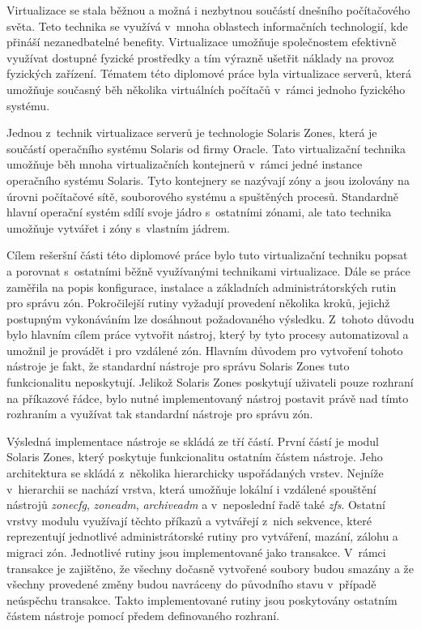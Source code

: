 \label{chapte:conclusion}
Virtualizace se stala běžnou a možná i nezbytnou součástí dnešního počítačového světa. Teto technika se využívá v~mnoha oblastech
informačních technologií, kde přináší nezanedbatelné benefity. Virtualizace umožňuje společnostem efektivně využívat dostupné 
fyzické prostředky a tím výrazně ušetřit náklady na provoz fyzických zařízení. Tématem této diplomové práce byla virtualizace serverů,
která umožňuje současný běh několika virtuálních počítačů v~rámci jednoho fyzického systému.

Jednou z~technik virtualizace serverů je technologie Solaris Zones, která je součástí operačního systému Solaris od firmy Oracle.
Tato virtualizační technika umožňuje běh mnoha virtualizačních kontejnerů v~rámci jedné instance operačního systému Solaris. Tyto
kontejnery se nazývají zóny a jsou izolovány na úrovni počítačové sítě, souborového systému a spuštěných procesů. Standardně hlavní
operační systém sdílí svoje jádro s~ostatními zónami, ale tato technika umožňuje vytvářet i zóny s~vlastním jádrem.

Cílem rešeršní části této diplomové práce bylo tuto virtualizační techniku popsat a porovnat s~ostatními běžně využívanými technikami
virtualizace. Dále se práce zaměřila na popis konfigurace, instalace a základních administrátorských rutin pro správu zón.
Pokročilejší rutiny vyžadují provedení několika kroků, jejichž postupným vykonáváním lze dosáhnout požadovaného výsledku. Z~tohoto
důvodu bylo hlavním cílem práce vytvořit nástroj, který by tyto procesy automatizoval a umožnil je provádět i pro vzdálené zón.
Hlavním důvodem pro vytvoření tohoto nástroje je fakt, že standardní nástroje pro správu Solaris Zones tuto funkcionalitu neposkytují.
Jelikož Solaris Zones poskytují uživateli pouze rozhraní na příkazové řádce, bylo nutné implementovaný nástroj postavit právě nad tímto
rozhraním a využívat tak standardní nástroje pro správu zón.

Výsledná implementace nástroje se skládá ze tří částí. První částí je modul Solaris Zones, který poskytuje funkcionalitu ostatním
částem nástroje. Jeho architektura se skládá z~několika hierarchicky uspořádaných vrstev. Nejníže v~hierarchii se nachází vrstva,
která umožňuje lokální i vzdálené spouštění nástrojů \textit{zonecfg}, \textit{zoneadm}, \textit{archiveadm} a v~neposlední řadě 
také \textit{zfs}. Ostatní vrstvy modulu využívají těchto příkazů a vytvářejí z~nich sekvence, které reprezentují jednotlivé 
administrátorské rutiny pro vytváření, mazání, zálohu a migraci zón. Jednotlivé rutiny jsou implementované jako transakce. V~rámci
transakce je zajištěno, že všechny dočasně vytvořené soubory budou smazány a že všechny provedené změny budou navráceny
do původního stavu v~případě neúspěchu transakce. Takto implementované rutiny jsou poskytovány ostatním částem nástroje pomocí
předem definovaného rozhraní. 

